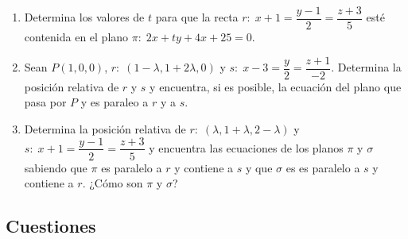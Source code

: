 \begin{enumerate}
\item Determina los valores de $t$ para que la recta $r:\; x+1=\dfrac{y-1}2=\dfrac{z+3}5$ esté contenida en el plano $\pi:\; 2x+ty+4x+25=0$.

\vspace{2mm} 

\item Sean $P(1,0,0)$, $r:\; (1-\lambda,1+2\lambda,0)$ y $s:\; x-3=\dfrac y 2 = \dfrac{z+1}{-2}$. Determina la posición relativa de $r$ y $s$ y encuentra, si es posible, la ecuación del plano que pasa por $P$ y es paraleo a $r$ y a $s$.

\vspace{2mm} 

\item Determina la posición relativa de $r:\; (\lambda, 1+\lambda, 2-\lambda)$ y $s:\; x+1=\dfrac{y-1}2=\dfrac{z+3}5$ y encuentra las ecuaciones de los planos $\pi$ y $\sigma$ sabiendo que $\pi$ es paralelo a $r$ y contiene a $s$ y que $\sigma$ es es paralelo a $s$ y contiene a $r$. ¿Cómo son $\pi$ y $\sigma$?

\vspace{2mm} 

\end{enumerate}


\subsection{Cuestiones}


